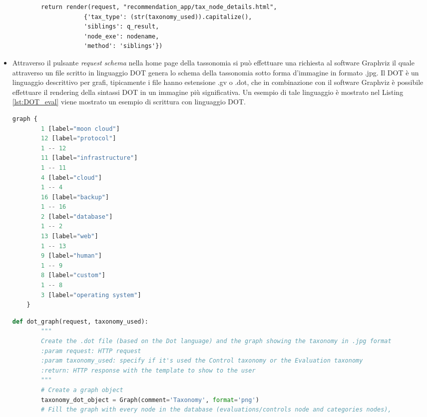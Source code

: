 \begin{itemize}
\begin{lstlisting}
        return render(request, "recommendation_app/tax_node_details.html",
                    {'tax_type': (str(taxonomy_used)).capitalize(),
                    'siblings': q_result,
                    'node_exe': nodename,
                    'method': 'siblings'})
    \end{lstlisting}
    \item Attraverso il pulsante \textit{request schema} nella home page della tassonomia si può effettuare una richiesta al software 
    Graphviz il quale attraverso un file scritto in linguaggio DOT genera lo schema della tassonomia sotto forma d'immagine in formato .jpg.\hfill\break
    Il DOT è un linguaggio descrittivo per grafi, tipicamente i file hanno estensione .gv o .dot, che in combinazione con il software Graphviz è possibile 
    effettuare il rendering della sintassi DOT in un immagine più significativa. Un esempio di tale linguaggio è mostrato nel Listing \ref{lst:DOT_eval} 
    viene mostrato un esempio di scrittura con linguaggio DOT.
    \lstset{style=python_code_style}
    \begin{lstlisting}[language=Python, label=lst:DOT_eval, caption={Codice parziale utilizzato per realizzare lo schema della tassonomia
        per le Evaluation.}]
    graph {
        1 [label="moon cloud"]
        12 [label="protocol"]
        1 -- 12
        11 [label="infrastructure"]
        1 -- 11
        4 [label="cloud"]
        1 -- 4
        16 [label="backup"]
        1 -- 16
        2 [label="database"]
        1 -- 2
        13 [label="web"]
        1 -- 13
        9 [label="human"]
        1 -- 9
        8 [label="custom"]
        1 -- 8
        3 [label="operating system"]
    }
    \end{lstlisting}
    \lstset{style=python_code_style}
    \begin{lstlisting}[language=Python, label=lst:view_DOT_eval, caption={Codice utilizzato per la realizzazione del
        file .dot e relativa immagine .jpg.}]
    def dot_graph(request, taxonomy_used):
        """
        Create the .dot file (based on the Dot language) and the graph showing the taxonomy in .jpg format
        :param request: HTTP request
        :param taxonomy_used: specify if it's used the Control taxonomy or the Evaluation taxonomy
        :return: HTTP response with the template to show to the user
        """
        # Create a graph object
        taxonomy_dot_object = Graph(comment='Taxonomy', format='png')
        # Fill the graph with every node in the database (evaluations/controls node and categories nodes), 

\end{lstlisting}
\end{itemize}
